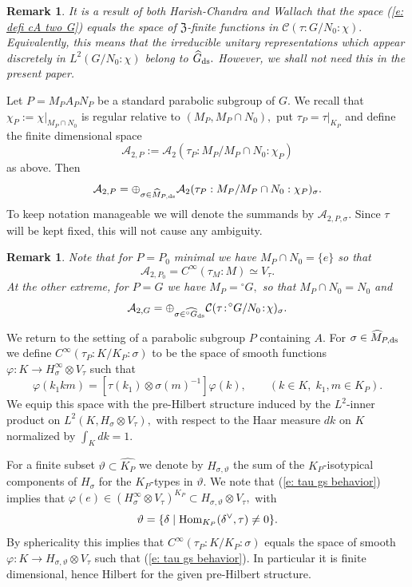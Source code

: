\documentclass[12pt,a4paper]{article}
\newtheorem{Rem}[Thm]{Remark}
\newenvironment{rem}[0]{\begin{Rem}\noindent\rm}%
{\end{Rem}}
\def\qquad{\quad\quad}
\def\gd{\delta}
\def\gf{\varphi}
\def\gs{\sigma}
\def\to{\rightarrow}
\def\Hom{{\rm Hom}}
\def\cA{{\mathcal A}}
\def\cC{{\mathcal C}}
\numberwithin{Thm}{section}
\numberwithin{equation}{section}
\def\Vtau{V_\tau}
\def\fZ{{\mathfrak Z}}
\numberwithin{equation}{section}
\def\fZ{{\mathfrak Z}}
\def\cAtwoP{\cA_{2,P}}
\def\col{\!:\!}
\def\MPds{\widehat M_{P,\rm ds}}
\def\cAtwoPgs{\cA_{2,P,\gs}}
\def\veec{\vee}%
\begin{document}
\begin{rem}
It is a result of both Harish-Chandra \cite{HCwhit} and Wallach \cite{Wrrg2} that 
the space (\ref{e: defi cA two G}) equals the space of $\fZ$-finite functions in $\cC(\tau: G/N_0: \chi).$
Equivalently, this means that the irreducible unitary representations which appear discretely in 
$L^2(G/N_0: \chi)$ belong to $\widehat G_{\rm ds}.$ However, we shall not 
need this in the present paper.
\end{rem}

Let 
$P = M_PA_PN_P$ be a standard parabolic subgroup of $G.$ 
We recall that $\chi_P:= \chi|_{M_P \cap N_0}$ is regular relative to $(M_P, M_P \cap N_0),$ 
put $\tau_P= \tau|_{K_P}$ 
and define the finite dimensional space 
\begin{equation}
\label{e: defi cAtwoP}
\cAtwoP:= \cA_2 (\tau_P: M_P/ M_P\cap N_0:\chi_P)
\end{equation}
as above. Then 
\begin{equation}
\label{e: deco cA P in ds types}
\cAtwoP = \oplus_{\gs \in \MPds} \cA_2 (\tau_P: M_P/M_P\cap N_0:\chi_P)_\gs.
\end{equation}
To keep notation manageable we will denote the summands by $\cAtwoPgs.$ 
Since $\tau$ will be kept fixed, this will not cause any ambiguity.

\begin{rem}
Note that for $P = P_0$ minimal we have $M_P \cap N_0 = \{e\}$ so that 
$$ 
\cA_{2, P_0} = C^\infty(\tau_M: M) \simeq \Vtau.
$$%
At the other extreme, for $P =G$ we have $M_P = {}^\circ G,$ so that $M_P \cap N_0 = N_0$ 
and 
$$ 
\cA_{2, G} = \oplus_{\gs \in \widehat{{}^\circ G}_{\rm ds}} \cC(\tau \col {}^\circ G/N_0 \col \chi)_\gs.
$$
\end{rem}

We return to the setting of a parabolic subgroup $P$ containing $A.$ 
For $\gs\in \MPds$ we define $C^\infty(\tau_P\col K/K_P \col \gs)$ 
to be the space of smooth functions $\gf: K \to H_\gs^\infty \otimes \Vtau$ 
such that
\begin{equation}
\label{e: tau gs behavior} 
\gf(k_1 k m)= [ \tau(k_1) \otimes \gs(m)^{-1}] \gf(k), \qquad (k\in K, \; k_1,m \in K_P).
\end{equation}
We equip this space with the pre-Hilbert structure induced by the $L^2$-inner product on $L^2(K, H_\gs \otimes \Vtau),$ with respect to the Haar measure $dk$ on $K$ normalized
by $\int_K dk =1.$ 
 
For a finite subset $\vartheta \subset \widehat{K_P}$ we denote by 
$H_{\gs, \vartheta}$ the sum of the $K_P$-isotypical components of $H_\gs$ for the 
$K_P$-types in $\vartheta.$ 
We note that (\ref{e: tau gs behavior}) implies that 
$\gf(e) \in (H^\infty_\gs \otimes \Vtau)^{K_P}\subset H_{\gs,\vartheta} \otimes \Vtau,$ 
with 
$$ 
\vartheta = \{\gd\mid \Hom_{K_P}(\gd^\veec, \tau) \not= 0\}.
$$ 
 By sphericality 
this implies that $C^\infty(\tau_P\col K/K_P \col \gs)$ equals the space of 
smooth $\gf: K \to H_{\gs, \vartheta} \otimes \Vtau$ such that (\ref{e: tau gs behavior}).
In particular it is finite dimensional, hence Hilbert for the given pre-Hilbert structure.
\end{document}
